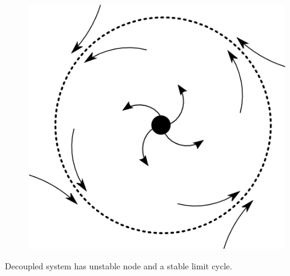 \documentclass[10pt,reqno]{beamer}
\begin{document}
\begin{frame}
\begin{columns}[t]
\begin{column}{.49\textwidth}
\begin{figure}
	\includegraphics[scale = 0.16]{hopf.png}
\end{figure}
Decoupled system has unstable node and a stable limit cycle.
\end{column}
\end{columns}
\end{frame}
\end{document}
